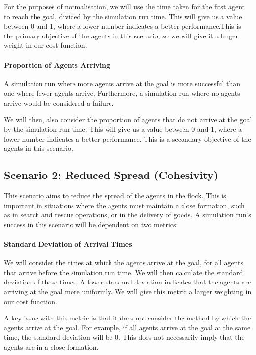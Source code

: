 \documentclass[12pt]{article}
\begin{document}
For the purposes of normalisation, we will use the time taken for the first agent to reach the goal, divided by the simulation run time. This will give us a value between 0 and 1, where a lower number indicates a better performance.This is the primary objective of the agents in this scenario, so we will give it a larger weight in our cost function.

\paragraph{Proportion of Agents Arriving} A simulation run where more agents arrive at the goal is more successful than one where fewer agents arrive. Furthermore, a simulation run where no agents arrive would be considered a failure.

We will then, also consider the proportion of agents that do not arrive at the goal by the simulation run time. This will give us a value between 0 and 1, where a lower number indicates a better performance. This is a secondary objective of the agents in this scenario.

\subsection{Scenario 2: Reduced Spread (Cohesivity)}
This scenario aims to reduce the spread of the agents in the flock. This is important in situations where the agents must maintain a close formation, such as in search and rescue operations, or in the delivery of goods. A simulation run's success in this scenario will be dependent on two metrics:

\paragraph{Standard Deviation of Arrival Times} We will consider the times at which the agents arrive at the goal, for all agents that arrive before the simulation run time. We will then calculate the standard deviation of these times. A lower standard deviation indicates that the agents are arriving at the goal more uniformly. We will give this metric a larger weighting in our cost function.

A key issue with this metric is that it does not consider the method by which the agents arrive at the goal. For example, if all agents arrive at the goal at the same time, the standard deviation will be 0. This does not necessarily imply that the agents are in a close formation.
\end{document}
